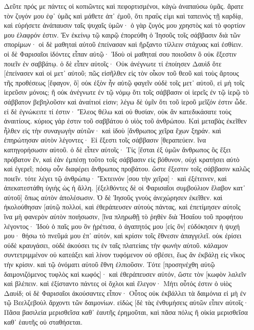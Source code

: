 Δεῦτε πρός με πάντες οἱ κοπιῶντες καὶ πεφορτισμένοι, κἀγὼ ἀναπαύσω ὑμᾶς. 
ἄρατε τὸν ζυγόν μου ἐφ᾽ ὑμᾶς καὶ μάθετε ἀπ᾽ ἐμοῦ, ὅτι πραΰς εἰμι καὶ ταπεινὸς τῇ καρδίᾳ, καὶ εὑρήσετε ἀνάπαυσιν ταῖς ψυχαῖς ὑμῶν· 
ὁ γὰρ ζυγός μου χρηστὸς καὶ τὸ φορτίον μου ἐλαφρόν ἐστιν. 
Ἐν ἐκείνῳ τῷ καιρῷ ἐπορεύθη ὁ Ἰησοῦς τοῖς σάββασιν διὰ τῶν σπορίμων· οἱ δὲ μαθηταὶ αὐτοῦ ἐπείνασαν καὶ ἤρξαντο τίλλειν στάχυας καὶ ἐσθίειν. 
οἱ δὲ Φαρισαῖοι ἰδόντες εἶπαν αὐτῷ· Ἰδοὺ οἱ μαθηταί σου ποιοῦσιν ὃ οὐκ ἔξεστιν ποιεῖν ἐν σαββάτῳ. 
ὁ δὲ εἶπεν αὐτοῖς· Οὐκ ἀνέγνωτε τί ἐποίησεν Δαυὶδ ὅτε [ἐπείνασεν καὶ οἱ μετ᾽ αὐτοῦ; 
πῶς εἰσῆλθεν εἰς τὸν οἶκον τοῦ θεοῦ καὶ τοὺς ἄρτους τῆς προθέσεως [ἔφαγον, ὃ] οὐκ ἐξὸν ἦν αὐτῷ φαγεῖν οὐδὲ τοῖς μετ᾽ αὐτοῦ, εἰ μὴ τοῖς ἱερεῦσιν μόνοις; 
ἢ οὐκ ἀνέγνωτε ἐν τῷ νόμῳ ὅτι τοῖς σάββασιν οἱ ἱερεῖς ἐν τῷ ἱερῷ τὸ σάββατον βεβηλοῦσιν καὶ ἀναίτιοί εἰσιν; 
λέγω δὲ ὑμῖν ὅτι τοῦ ἱεροῦ μεῖζόν ἐστιν ὧδε. 
εἰ δὲ ἐγνώκειτε τί ἐστιν· Ἔλεος θέλω καὶ οὐ θυσίαν, οὐκ ἂν κατεδικάσατε τοὺς ἀναιτίους. 
κύριος γάρ ἐστιν τοῦ σαββάτου ὁ υἱὸς τοῦ ἀνθρώπου. 
Καὶ μεταβὰς ἐκεῖθεν ἦλθεν εἰς τὴν συναγωγὴν αὐτῶν· 
καὶ ἰδοὺ [ἄνθρωπος χεῖρα ἔχων ξηράν. καὶ ἐπηρώτησαν αὐτὸν λέγοντες· Εἰ ἔξεστι τοῖς σάββασιν [θεραπεύειν. ἵνα κατηγορήσωσιν αὐτοῦ. 
ὁ δὲ εἶπεν αὐτοῖς· Τίς [ἔσται ἐξ ὑμῶν ἄνθρωπος ὃς ἕξει πρόβατον ἕν, καὶ ἐὰν ἐμπέσῃ τοῦτο τοῖς σάββασιν εἰς βόθυνον, οὐχὶ κρατήσει αὐτὸ καὶ ἐγερεῖ; 
πόσῳ οὖν διαφέρει ἄνθρωπος προβάτου. ὥστε ἔξεστιν τοῖς σάββασιν καλῶς ποιεῖν. 
τότε λέγει τῷ ἀνθρώπῳ· Ἔκτεινόν [σου τὴν χεῖρα]· καὶ ἐξέτεινεν, καὶ ἀπεκατεστάθη ὑγιὴς ὡς ἡ ἄλλη. 
[ἐξελθόντες δὲ οἱ Φαρισαῖοι συμβούλιον ἔλαβον κατ᾽ αὐτοῦ] ὅπως αὐτὸν ἀπολέσωσιν. 
Ὁ δὲ Ἰησοῦς γνοὺς ἀνεχώρησεν ἐκεῖθεν. καὶ ἠκολούθησαν [αὐτῷ πολλοί, καὶ ἐθεράπευσεν αὐτοὺς πάντας, 
καὶ ἐπετίμησεν αὐτοῖς ἵνα μὴ φανερὸν αὐτὸν ποιήσωσιν, 
[ἵνα πληρωθῇ τὸ ῥηθὲν διὰ Ἠσαΐου τοῦ προφήτου λέγοντος· 
Ἰδοὺ ὁ παῖς μου ὃν ᾑρέτισα, ὁ ἀγαπητός μου [εἰς ὃν] εὐδόκησεν ἡ ψυχή μου· θήσω τὸ πνεῦμά μου ἐπ᾽ αὐτόν, καὶ κρίσιν τοῖς ἔθνεσιν ἀπαγγελεῖ. 
οὐκ ἐρίσει οὐδὲ κραυγάσει, οὐδὲ ἀκούσει τις ἐν ταῖς πλατείαις τὴν φωνὴν αὐτοῦ. 
κάλαμον συντετριμμένον οὐ κατεάξει καὶ λίνον τυφόμενον οὐ σβέσει, ἕως ἂν ἐκβάλῃ εἰς νῖκος τὴν κρίσιν. 
καὶ τῷ ὀνόματι αὐτοῦ ἔθνη ἐλπιοῦσιν. 
Τότε [προσηνέχθη αὐτῷ δαιμονιζόμενος τυφλὸς καὶ κωφός]· καὶ ἐθεράπευσεν αὐτόν, ὥστε τὸν [κωφὸν λαλεῖν καὶ βλέπειν. 
καὶ ἐξίσταντο πάντες οἱ ὄχλοι καὶ ἔλεγον· Μήτι οὗτός ἐστιν ὁ υἱὸς Δαυίδ; 
οἱ δὲ Φαρισαῖοι ἀκούσαντες εἶπον· Οὗτος οὐκ ἐκβάλλει τὰ δαιμόνια εἰ μὴ ἐν τῷ Βεελζεβοὺλ ἄρχοντι τῶν δαιμονίων. 
εἰδὼς [δὲ τὰς ἐνθυμήσεις αὐτῶν εἶπεν αὐτοῖς· Πᾶσα βασιλεία μερισθεῖσα καθ᾽ ἑαυτῆς ἐρημοῦται, καὶ πᾶσα πόλις ἢ οἰκία μερισθεῖσα καθ᾽ ἑαυτῆς οὐ σταθήσεται. 
